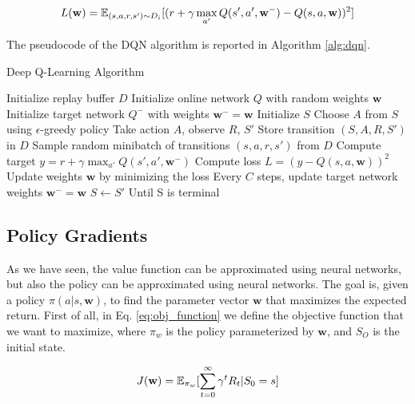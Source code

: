 \begin{equation} \label{eq:dqn_loss}
    L(\textbf{w}) = \operatorname{\mathbb{E}}_{(s, a, r, s') \sim D_i} [(r + \gamma \max_{a'} Q(s', a', \textbf{w}^-) - Q(s, a, \textbf{w}))^2]
\end{equation}

The pseudocode of the DQN algorithm is reported in Algorithm \ref{alg:dqn}.

\begin{algorithm}
\caption{Deep Q-Learning Algorithm}\label{alg:dqn}
\begin{algorithmic}
\State Initialize replay buffer $D$
\State Initialize online network $Q$ with random weights $\textbf{w}$
\State Initialize target network $Q^-$ with weights $\textbf{w}^- = \textbf{w}$
    \State Initialize $S$
        \State Choose $A$ from $S$ using $\epsilon$-greedy policy
        \State Take action $A$, observe $R$, $S'$
        \State Store transition $(S, A, R, S')$ in $D$
        \State Sample random minibatch of transitions $(s, a, r, s')$ from $D$
        \State Compute target $y = r + \gamma \max_{a'} Q(s', a', \textbf{w}^-)$
        \State Compute loss $L = (y - Q(s, a, \textbf{w}))^2$
        \State Update weights $\textbf{w}$ by minimizing the loss
        \State Every $C$ steps, update target network weights $\textbf{w}^- = \textbf{w}$
        \State $S \leftarrow S'$
    \EndFor
\State Until S is terminal
\EndFor
\end{algorithmic}
\end{algorithm}





\subsection{Policy Gradients}\label{subsec:policy_gradients}
As we have seen, the value function can be approximated using neural networks, but also the policy can be approximated using neural networks.
The goal is, given a policy $\pi(a|s, \textbf{w})$, to find the parameter vector $\textbf{w}$ that maximizes the expected return.
First of all, in Eq. \ref{eq:obj_function} we define the objective function that we want to maximize, where $\pi_w$ is the policy parameterized by $\textbf{w}$, and $S_O$ is the initial state.

\begin{equation} \label{eq:obj_function}
    J(\textbf{w}) = \operatorname{\mathbb{E}}_{\pi_w}[\sum_{t=0}^{\infty} \gamma^t R_t | S_0 = s]
\end{equation}

